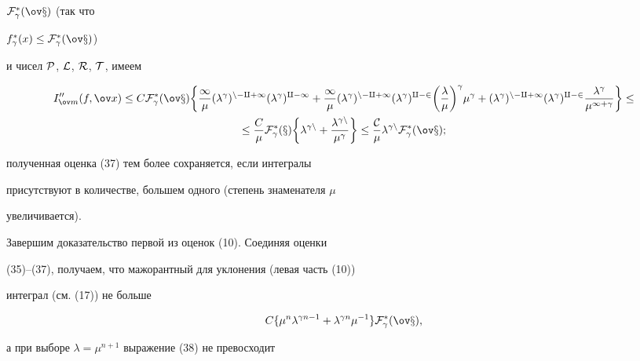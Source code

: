 \begin{pf}
$\cal F^*_\gamma(\ov x)$ (так что 


$f^*_\gamma(x)\le\cal F^*_\gamma(\ov x)$) 


и чисел $\cal P$, $\cal L$, $\cal R$, $\cal T$, имеем 


\begin{multline*} 


I''_{\ov m}(f,\ov x)\le C\cal F^*_\gamma(\ov x)\bigg\{ 


\frac{1}{\mu}(\lambda^\gamma)^{n-q+1}(\lambda^\gamma)^{q-1}+ 


\frac{1}{\mu}(\lambda^\gamma)^{n-q+1} 


(\lambda^\gamma)^{q-2}\bigg(\frac{\lambda}{\mu}\bigg)^\gamma 


\mu^\gamma+(\lambda^\gamma)^{n-q+1}(\lambda^\gamma)^{q-2} 


\frac{\lambda^\gamma}{\mu^{1+\gamma}}\bigg\}\le \\ 


% 


\le \frac{C}{\mu}\cal F^*_\gamma(x)\bigg\{ 


\lambda^{\gamma n}+\frac{\lambda^{\gamma n}}{\mu^\gamma}\bigg\} 


\le\frac{C}{\mu}\lambda^{\gamma n}\cal F^*_\gamma(\ov x); 


\end{multline*} 


полученная оценка (37) тем более сохраняется, если интегралы 


присутствуют в количестве, большем одного (степень знаменателя $\mu$ 


увеличивается). 


\end{pf} 


 


Завершим доказательство первой из оценок (10). Соединяя оценки 


(35)--(37), получаем, что мажорантный для уклонения (левая часть (10)) 


интеграл (см. (17)) не больше 


\begin{equation} 


C\{\mu^n\lambda^{\gamma n-1}+\lambda^{\gamma n} 


\mu^{-1}\}\cal F^*_\gamma(\ov x), 


\end{equation} 


а при выборе $\lambda=\mu^{n+1}$ выражение (38) не превосходит 



